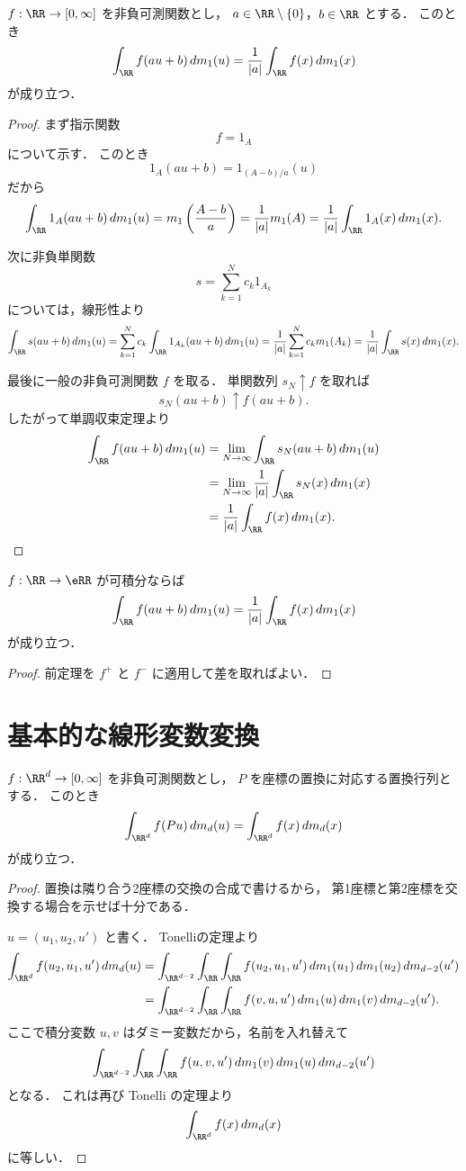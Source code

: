 \begin{theorem}
$f:\RR\to[0,\infty]$ を非負可測関数とし，
$a\in\RR\setminus\{0\}$，$b\in\RR$ とする．
このとき
\[
\int_{\RR}f(au+b)\,dm_1(u)
=
\frac{1}{|a|}\int_{\RR}f(x)\,dm_1(x)
\]
が成り立つ．
\end{theorem}
\begin{proof}
まず指示関数
\[
f=1_A
\]
について示す．
このとき
\[
1_A(au+b)=1_{(A-b)/a}(u)
\]
だから
\[
\int_{\RR}1_A(au+b)\,dm_1(u)
=
m_1\left(\frac{A-b}{a}\right)
=
\frac{1}{|a|}m_1(A)
=
\frac{1}{|a|}\int_{\RR}1_A(x)\,dm_1(x).
\]

次に非負単関数
\[
s=\sum_{k=1}^N c_k1_{A_k}
\]
については，線形性より
\[
\int_{\RR}s(au+b)\,dm_1(u)
=
\sum_{k=1}^N c_k\int_{\RR}1_{A_k}(au+b)\,dm_1(u)
=
\frac{1}{|a|}\sum_{k=1}^N c_km_1(A_k)
=
\frac{1}{|a|}\int_{\RR}s(x)\,dm_1(x).
\]

最後に一般の非負可測関数 $f$ を取る．
単関数列 $s_N\uparrow f$ を取れば
\[
s_N(au+b)\uparrow f(au+b).
\]
したがって単調収束定理より
\begin{align*}
\int_{\RR}f(au+b)\,dm_1(u)
&=
\lim_{N\to\infty}\int_{\RR}s_N(au+b)\,dm_1(u) \\
&=
\lim_{N\to\infty}\frac{1}{|a|}\int_{\RR}s_N(x)\,dm_1(x) \\
&=
\frac{1}{|a|}\int_{\RR}f(x)\,dm_1(x).
\end{align*}
\end{proof}

\begin{corollary}
$f:\RR\to\eRR$ が可積分ならば
\[
\int_{\RR}f(au+b)\,dm_1(u)
=
\frac{1}{|a|}\int_{\RR}f(x)\,dm_1(x)
\]
が成り立つ．
\end{corollary}
\begin{proof}
前定理を $f^+$ と $f^-$ に適用して差を取ればよい．
\end{proof}

\section{基本的な線形変数変換}

\begin{lemma}[座標の入れ替え]
$f:\RR^d\to[0,\infty]$ を非負可測関数とし，
$P$ を座標の置換に対応する置換行列とする．
このとき
\[
\int_{\RR^d}f(Pu)\,dm_d(u)=\int_{\RR^d}f(x)\,dm_d(x)
\]
が成り立つ．
\end{lemma}
\begin{proof}
置換は隣り合う2座標の交換の合成で書けるから，
第1座標と第2座標を交換する場合を示せば十分である．

$u=(u_1,u_2,u')$ と書く．
Tonelliの定理より
\begin{align*}
\int_{\RR^d}f(u_2,u_1,u')\,dm_d(u)
&=
\int_{\RR^{d-2}}\int_{\RR}\int_{\RR}f(u_2,u_1,u')\,dm_1(u_1)\,dm_1(u_2)\,dm_{d-2}(u') \\
&=
\int_{\RR^{d-2}}\int_{\RR}\int_{\RR}f(v,u,u')\,dm_1(u)\,dm_1(v)\,dm_{d-2}(u').
\end{align*}
ここで積分変数 $u,v$ はダミー変数だから，名前を入れ替えて
\[
\int_{\RR^{d-2}}\int_{\RR}\int_{\RR}f(u,v,u')\,dm_1(v)\,dm_1(u)\,dm_{d-2}(u')
\]
となる．
これは再び Tonelli の定理より
\[
\int_{\RR^d}f(x)\,dm_d(x)
\]
に等しい．
\end{proof}

